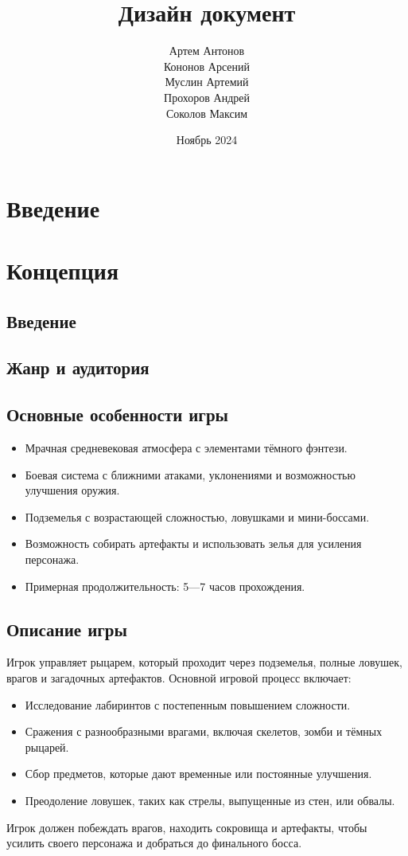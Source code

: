\documentclass{article}
\title{Дизайн документ}
\author{Артем Антонов \\ Кононов Арсений  \\ Муслин Артемий \\ Прохоров Андрей \\ Соколов Максим}
\date{Ноябрь 2024}
\begin{document}
\maketitle

\tableofcontents

\section{Введение}

\section{Концепция}

\subsection{Введение}

\subsection{Жанр и аудитория}

\subsection{Основные особенности игры}
\begin{itemize}
    \item Мрачная средневековая атмосфера с элементами тёмного фэнтези.
    \item Боевая система с ближними атаками, уклонениями и возможностью улучшения оружия.
    \item Подземелья с возрастающей сложностью, ловушками и мини-боссами.
    \item Возможность собирать артефакты и использовать зелья для усиления персонажа.
    \item Примерная продолжительность: 5—7 часов прохождения.
\end{itemize}

\subsection{Описание игры}
Игрок управляет рыцарем, который проходит через подземелья, полные ловушек, врагов и загадочных артефактов. Основной игровой процесс включает:
\begin{itemize}
    \item Исследование лабиринтов с постепенным повышением сложности.
    \item Сражения с разнообразными врагами, включая скелетов, зомби и тёмных рыцарей.
    \item Сбор предметов, которые дают временные или постоянные улучшения.
    \item Преодоление ловушек, таких как стрелы, выпущенные из стен, или обвалы.
\end{itemize}
Игрок должен побеждать врагов, находить сокровища и артефакты, чтобы усилить своего персонажа и добраться до финального босса.
\end{document}
